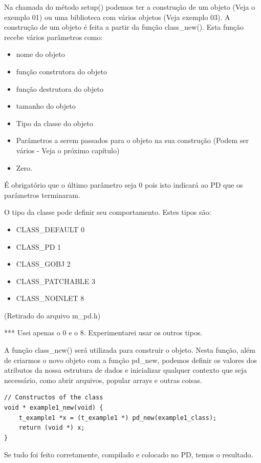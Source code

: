 \documentclass[10pt,a4paper]{report}
\begin{document}
Na chamada do método setup() podemos ter a construção de um objeto (Veja o exemplo 01) ou uma biblioteca com vários objetos (Veja exemplo 03). A construção de um objeto é feita a partir da função class\_new(). Esta função recebe vários parâmetros como:
\begin{itemize}
\item nome do objeto
\item função construtora do objeto
\item função destrutora do objeto
\item tamanho do objeto
\item Tipo da classe do objeto
\item Parâmetros a serem passados para o objeto na sua construção (Podem ser vários - Veja o próximo capítulo)
\item Zero.
\end{itemize}

É obrigatório que o último parâmetro seja 0 pois isto indicará ao PD que os parâmetros terminaram.

O tipo da classe pode definir seu comportamento. Estes tipos são:

\begin{itemize}
\item CLASS\_DEFAULT 0
\item CLASS\_PD 1
\item CLASS\_GOBJ 2
\item CLASS\_PATCHABLE 3
\item CLASS\_NOINLET 8
\end{itemize}

(Retirado do arquivo m\_pd.h)

*** Usei apenas o 0 e o 8. Experimentarei usar os outros tipos.

A função class\_new() será utilizada para construir o objeto. Nesta função, além de criarmos o novo objeto com a função pd\_new, podemos definir os valores dos atributos da nossa estrutura de dados e inicializar qualquer contexto que seja necessário, como abrir arquivos, popular arrays e outras coisas.

\begin{lstlisting}
// Constructos of the class
void * example1_new(void) {
    t_example1 *x = (t_example1 *) pd_new(example1_class);
    return (void *) x;
}
\end{lstlisting}

Se tudo foi feito corretamente, compilado e colocado no PD, temos o resultado.
\end{document}
